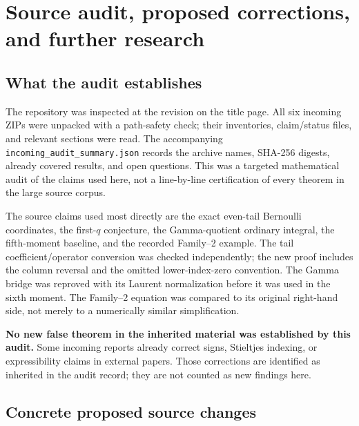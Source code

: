\section{Source audit, proposed corrections, and further research}
\label{audit:sec}

\subsection{What the audit establishes}

The repository was inspected at the revision on the title page.
All six incoming ZIPs were unpacked with a path-safety check; their
inventories, claim/status files, and relevant sections were read.
The accompanying \texttt{incoming\_audit\_summary.json} records the
archive names, SHA-256 digests, already covered results, and open
questions.  This was a targeted mathematical audit of the claims
used here, not a line-by-line certification of every theorem in the
large source corpus.

The source claims used most directly are the exact even-tail
Bernoulli coordinates, the first-$q$ conjecture, the Gamma-quotient
ordinary integral, the fifth-moment baseline, and the recorded
Family--2 example.  The tail coefficient/operator conversion was
checked independently; the new proof includes the column reversal
and the omitted lower-index-zero convention.  The Gamma bridge
was reproved with its Laurent normalization before it was used in
the sixth moment.  The Family--2 equation was compared to its
original right-hand side, not merely to a numerically similar
simplification.

\textbf{No new false theorem in the inherited material was established
by this audit.}  Some incoming reports already correct signs,
Stieltjes indexing, or expressibility claims in external papers.
Those corrections are identified as inherited in the audit record;
they are not counted as new findings here.

\subsection{Concrete proposed source changes}

